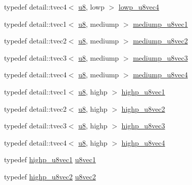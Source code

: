 \begin{CompactItemize}
\item 
typedef detail::tvec4$<$ \hyperlink{group__gtc__type__precision_g5e3dc67373d5068997d2d9f41c9024d2}{u8}, lowp $>$ \hyperlink{group__gtc__type__precision_g98f82380862128fac9afae1b53840562}{lowp\_\-u8vec4}
\item 
typedef detail::tvec1$<$ \hyperlink{group__gtc__type__precision_g5e3dc67373d5068997d2d9f41c9024d2}{u8}, mediump $>$ \hyperlink{group__gtc__type__precision_gdefca284b7a5980fb6be735abb77395e}{mediump\_\-u8vec1}
\item 
typedef detail::tvec2$<$ \hyperlink{group__gtc__type__precision_g5e3dc67373d5068997d2d9f41c9024d2}{u8}, mediump $>$ \hyperlink{group__gtc__type__precision_g5e20c1315bc1fecc867bc74525bea2ab}{mediump\_\-u8vec2}
\item 
typedef detail::tvec3$<$ \hyperlink{group__gtc__type__precision_g5e3dc67373d5068997d2d9f41c9024d2}{u8}, mediump $>$ \hyperlink{group__gtc__type__precision_g58f79eee840b2838443292c50ddb2919}{mediump\_\-u8vec3}
\item 
typedef detail::tvec4$<$ \hyperlink{group__gtc__type__precision_g5e3dc67373d5068997d2d9f41c9024d2}{u8}, mediump $>$ \hyperlink{group__gtc__type__precision_g407b5aa9a3fd6d344b70fa6ce2ce92d4}{mediump\_\-u8vec4}
\item 
typedef detail::tvec1$<$ \hyperlink{group__gtc__type__precision_g5e3dc67373d5068997d2d9f41c9024d2}{u8}, highp $>$ \hyperlink{group__gtc__type__precision_g8e7e9156357a2b748fe39702c3bdbeec}{highp\_\-u8vec1}
\item 
typedef detail::tvec2$<$ \hyperlink{group__gtc__type__precision_g5e3dc67373d5068997d2d9f41c9024d2}{u8}, highp $>$ \hyperlink{group__gtc__type__precision_g9aed4b3bacd37a43ec369bcf76be144a}{highp\_\-u8vec2}
\item 
typedef detail::tvec3$<$ \hyperlink{group__gtc__type__precision_g5e3dc67373d5068997d2d9f41c9024d2}{u8}, highp $>$ \hyperlink{group__gtc__type__precision_g52bdf53a4f05023c13a9b817526d249f}{highp\_\-u8vec3}
\item 
typedef detail::tvec4$<$ \hyperlink{group__gtc__type__precision_g5e3dc67373d5068997d2d9f41c9024d2}{u8}, highp $>$ \hyperlink{group__gtc__type__precision_g3a46f19674a65471988b41ffdaa834c5}{highp\_\-u8vec4}
\item 
typedef \hyperlink{group__gtc__type__precision_g8e7e9156357a2b748fe39702c3bdbeec}{highp\_\-u8vec1} \hyperlink{group__gtc__type__precision_gf0155c700da11c0b5518a777d1f0cd23}{u8vec1}
\item 
typedef \hyperlink{group__gtc__type__precision_g9aed4b3bacd37a43ec369bcf76be144a}{highp\_\-u8vec2} \hyperlink{group__gtc__type__precision_ga7ea171741c23b5bb2a3c91fe8c84e8a}{u8vec2}

\end{CompactItemize}
